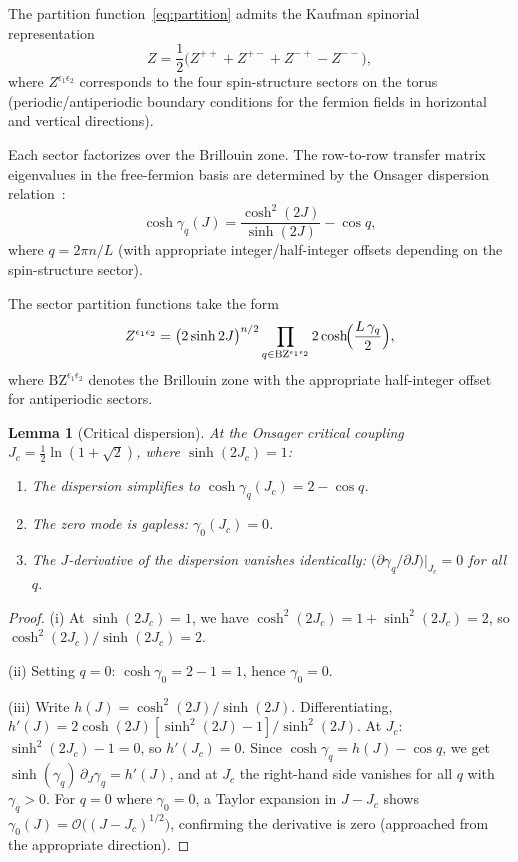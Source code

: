 \documentclass[11pt]{article}
\newtheorem{lemma}[theorem]{Lemma}
\theoremstyle{definition}
\theoremstyle{remark}
\newcommand{\Jc}{J_c}
\newcommand{\BZ}{\mathrm{BZ}}
\newcommand{\cO}{\mathcal{O}}
\begin{document}
The partition function~\eqref{eq:partition} admits the Kaufman
spinorial representation~\cite{Kaufman1949,SchultzMattisLieb1964}
\begin{equation}
  Z = \frac{1}{2}\bigl(Z^{++} + Z^{+-} + Z^{-+} - Z^{--}\bigr),
  \label{eq:kaufman-sectors}
\end{equation}
where $Z^{\epsilon_1 \epsilon_2}$ corresponds to the four spin-structure
sectors on the torus (periodic/antiperiodic boundary conditions for the
fermion fields in horizontal and vertical directions).

Each sector factorizes over the Brillouin zone.
The row-to-row transfer matrix eigenvalues in the free-fermion basis are
determined by the Onsager dispersion relation~\cite{McCoyWu1973}:
\begin{equation}
  \cosh \gamma_q(J) = \frac{\cosh^2(2J)}{\sinh(2J)} - \cos q,
  \label{eq:dispersion}
\end{equation}
where $q = 2\pi n / L$ (with appropriate integer/half-integer offsets
depending on the spin-structure sector).

The sector partition functions take the form
\begin{equation}
  Z^{\epsilon_1 \epsilon_2}
    = \bigl(2\sinh 2J\bigr)^{n/2}
      \prod_{q \in \BZ^{\epsilon_1 \epsilon_2}}
        2\cosh\!\Bigl(\frac{L\,\gamma_q}{2}\Bigr),
  \label{eq:sector-product}
\end{equation}
where $\BZ^{\epsilon_1 \epsilon_2}$ denotes the Brillouin zone with the
appropriate half-integer offset for antiperiodic sectors.

\begin{lemma}[Critical dispersion]
\label{lem:critical-dispersion}
At the Onsager critical coupling $\Jc = \frac{1}{2}\ln(1+\sqrt{2})$,
where $\sinh(2\Jc) = 1$:
\begin{enumerate}
  \item The dispersion simplifies to
    $\cosh\gamma_q(\Jc) = 2 - \cos q$.
  \item The zero mode is gapless: $\gamma_0(\Jc) = 0$.
  \item The $J$-derivative of the dispersion vanishes identically:
    $\bigl(\partial\gamma_q/\partial J\bigr)\big|_{\Jc} = 0$
    for all $q$.
\end{enumerate}
\end{lemma}

\begin{proof}
(i) At $\sinh(2\Jc) = 1$, we have $\cosh^2(2\Jc) = 1 + \sinh^2(2\Jc) = 2$,
so $\cosh^2(2\Jc)/\sinh(2\Jc) = 2$.

(ii) Setting $q = 0$: $\cosh\gamma_0 = 2 - 1 = 1$, hence $\gamma_0 = 0$.

(iii) Write $h(J) = \cosh^2(2J)/\sinh(2J)$.
Differentiating, $h'(J) = 2\cosh(2J)[\sinh^2(2J) - 1]/\sinh^2(2J)$.
At $\Jc$: $\sinh^2(2\Jc) - 1 = 0$, so $h'(\Jc) = 0$.
Since $\cosh\gamma_q = h(J) - \cos q$, we get
$\sinh(\gamma_q)\,\partial_J\gamma_q = h'(J)$,
and at $\Jc$ the right-hand side vanishes for all $q$ with $\gamma_q > 0$.
For $q = 0$ where $\gamma_0 = 0$, a Taylor expansion in $J-\Jc$ shows
$\gamma_0(J) = \cO\bigl((J-\Jc)^{1/2}\bigr)$, confirming the derivative
is zero (approached from the appropriate direction).
\end{proof}
\end{document}
